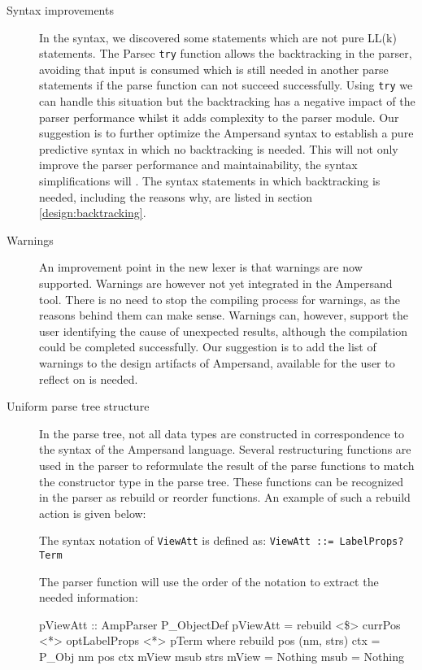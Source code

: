 \begin{description}
  \item[Syntax improvements]
    In the syntax, we discovered some statements which are not pure LL(k) statements.
    The Parsec \texttt{try} function allows the backtracking in the parser, avoiding that input is consumed which is still needed in another parse statements if the parse function can not succeed successfully.
    Using \texttt{try} we can handle this situation but the backtracking has a negative impact of the parser performance whilst it adds complexity to the parser module. 
    Our suggestion is to further optimize the Ampersand syntax to establish a pure predictive syntax in which no backtracking is needed.
    This will not only improve the parser performance and maintainability, the syntax simplifications will .
    The syntax statements in which backtracking is needed, including the reasons why, are listed in section \autoref{design:backtracking}.

  \item[Warnings]
    An improvement point in the new lexer is that warnings are now supported. 
    Warnings are however not yet integrated in the Ampersand tool.
    There is no need to stop the compiling process for warnings, as the reasons behind them can make sense.
    Warnings can, however, support the user identifying the cause of unexpected results, although the compilation could be completed successfully.
    Our suggestion is to add the list of warnings to the design artifacts of Ampersand, available for the user to reflect on is needed.

  \item[Uniform parse tree structure]
  
   In the parse tree, not all data types are constructed in correspondence to the syntax of the Ampersand language.
   Several restructuring functions are used in the parser to reformulate the result of the parse functions to match the constructor type in the parse tree.
   These functions can be recognized in the parser as rebuild or reorder functions.
   An example of such a rebuild action is given below:

   The syntax notation of \texttt{ViewAtt} is defined as: \texttt{ViewAtt ::= LabelProps? Term}
   
   The parser function will use the order of the notation to extract the needed information:

   \begin{haskell}
          pViewAtt :: AmpParser P_ObjectDef
          pViewAtt = rebuild <\$> currPos <*> optLabelProps <*> pTerm
              where rebuild pos (nm, strs) ctx = P_Obj nm pos ctx mView msub strs
                    mView = Nothing
                    msub  = Nothing
   \end{haskell}
 

\end{description}
